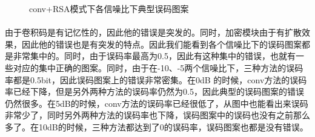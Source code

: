 \begin{figure}[h]
		\centering
		\caption{conv+RSA模式下各信噪比下典型误码图案}	
\end{figure}

\paragraph{}由于卷积码是有记忆性的，因此他的错误是突发的。同时，加密模块由于有扩散效果，因此他的错误也是有突发的特点。因此我们能看到各个信噪比下的误码图案都是非常集中的。同时，由于误码率最高为0.5，因此有这种集中的错误，也就有一些对应的集中正确的图案。同时，由于在-10、-5两个信噪比下，三种方法的误码率都是0.5bit，因此误码图案上的错误非常密集。在0dB 的时候，conv方法的误码率已经下降，但是另外两种方法的误码率仍然为0.5，因此典型的误码图案的错误仍然很多。在5dB的时候，conv方法的误码率已经很低了，从图中也能看出来误码非常少了，同时另外两种方法的误码率也下降，误码图案中的误码也没有之前那么多了。在10dB的时候，三种方法都达到了0的误码率，误码图案也都是没有错误。


